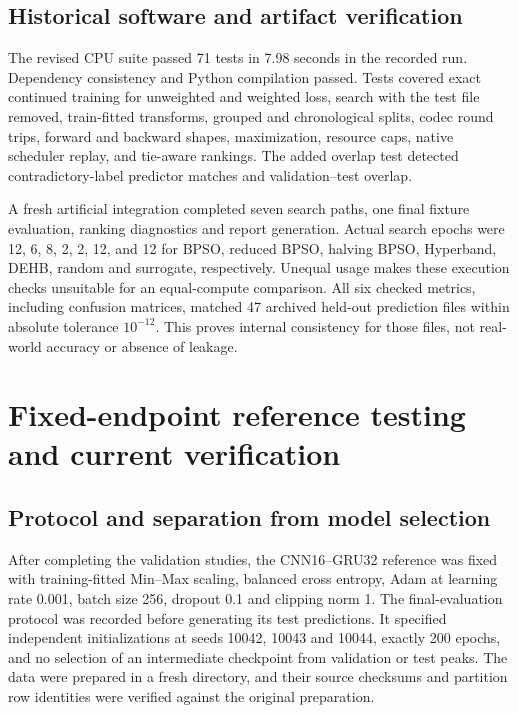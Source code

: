 \documentclass[11pt,a4paper]{report}
\begin{document}
\section{Historical software and artifact verification}
The revised CPU suite passed 71 tests in 7.98 seconds in the recorded run. Dependency consistency and Python compilation passed. Tests covered exact continued training for unweighted and weighted loss, search with the test file removed, train-fitted transforms, grouped and chronological splits, codec round trips, forward and backward shapes, maximization, resource caps, native scheduler replay, and tie-aware rankings. The added overlap test detected contradictory-label predictor matches and validation--test overlap.

A fresh artificial integration completed seven search paths, one final fixture evaluation, ranking diagnostics and report generation. Actual search epochs were 12, 6, 8, 2, 2, 12, and 12 for BPSO, reduced BPSO, halving BPSO, Hyperband, DEHB, random and surrogate, respectively. Unequal usage makes these execution checks unsuitable for an equal-compute comparison. All six checked metrics, including confusion matrices, matched 47 archived held-out prediction files within absolute tolerance $10^{-12}$. This proves internal consistency for those files, not real-world accuracy or absence of leakage.



\chapter{Fixed-endpoint reference testing and current verification}
\section{Protocol and separation from model selection}
After completing the validation studies, the CNN16--GRU32 reference was fixed with training-fitted Min--Max scaling, balanced cross entropy, Adam at learning rate 0.001, batch size 256, dropout 0.1 and clipping norm 1. The final-evaluation protocol was recorded before generating its test predictions. It specified independent initializations at seeds 10042, 10043 and 10044, exactly 200 epochs, and no selection of an intermediate checkpoint from validation or test peaks. The data were prepared in a fresh directory, and their source checksums and partition row identities were verified against the original preparation.
\end{document}
